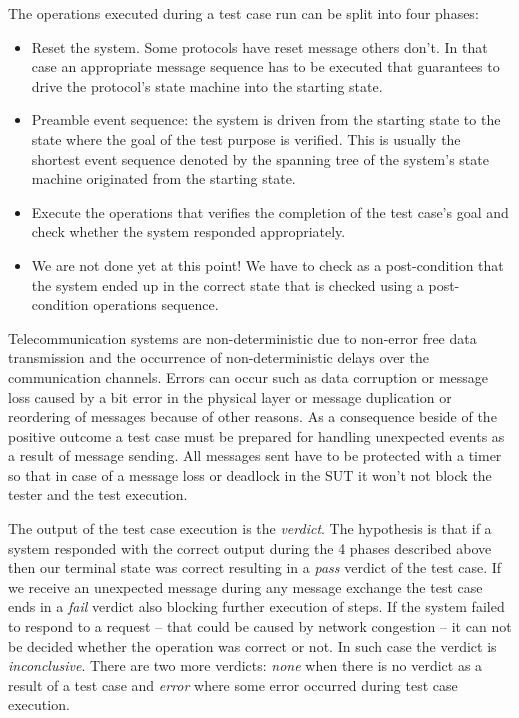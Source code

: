 \documentclass[a4paper]{article}
\begin{document}
The operations executed during a test case run can be split into four phases:
\begin{itemize}
    \item Reset the system. Some protocols have reset message others don't. In that case an appropriate message
          sequence
          has to be executed that guarantees to drive the protocol's state machine into the starting state.
    \item Preamble event sequence: the system is driven from the starting state to the state where the goal of the test
          purpose is verified. This is usually the shortest event sequence denoted by the spanning tree of the system's
          state
          machine originated from the starting state.
    \item Execute the operations that verifies the completion of the test case's goal and check whether the system
          responded appropriately.
    \item We are not done yet at this point! We have to check as a post-condition that the system ended up in the
          correct
          state that is checked using a post-condition operations sequence.
\end{itemize}

Telecommunication systems are non-deterministic due to non-error free data transmission and the occurrence of
non-deterministic delays over the communication channels. Errors can occur such as data corruption or message loss
caused by a bit error in the physical layer or message duplication or reordering of messages because of other reasons.
As a consequence beside of the positive outcome a test case must be prepared for handling unexpected events as a result
of message sending. All messages sent have to be protected with a timer so that in case of a message loss or deadlock
in the SUT it won't not block the tester and the test execution.

The output of the test case execution is the \emph{verdict}. The hypothesis is that if a system responded with the
correct output during the 4 phases described above then our terminal state was correct resulting in a \emph{pass}
verdict of the test case. If we receive an unexpected message during any message exchange the test case ends in a
\emph{fail} verdict also blocking further execution of steps. If the system failed to respond to a request -- that
could be caused by network congestion -- it can not be decided whether the operation was correct or not. In such case
the verdict is \emph{inconclusive}. There are two more verdicts: \emph{none} when there is no verdict as a result of a
test case and \emph{error} where some error occurred during test case execution.
\end{document}
